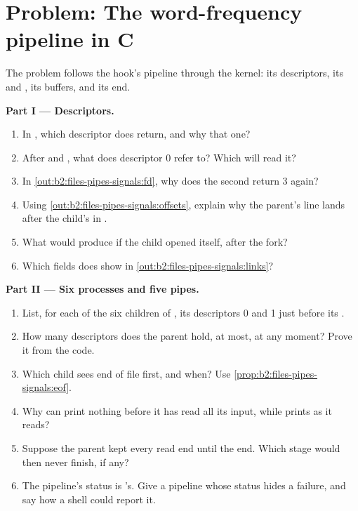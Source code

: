 \section{Problem: The word-frequency pipeline in C}\label{sec:b2:files-pipes-signals:problem}

\begin{problem}\label{pb:b2:files-pipes-signals:1}
The problem follows the hook's pipeline through the kernel: its descriptors, its  and , its
buffers, and its end.

\medskip\noindent\textbf{Part I --- Descriptors.}\par\nopagebreak
\begin{enumerate}
\item In , which descriptor does  return, and why that one?
\item After  and , what does descriptor 0 refer to? Which  will read it?
\item In \cref{out:b2:files-pipes-signals:fd}, why does the second  return 3 again?
\item Using \cref{out:b2:files-pipes-signals:offsets}, explain why the parent's line lands after the child's in
.
\item What would  produce if the child opened  itself, after the fork?
\item Which  fields does  show in \cref{out:b2:files-pipes-signals:links}?
\end{enumerate}

\medskip\noindent\textbf{Part II --- Six processes and five pipes.}\par\nopagebreak
\begin{enumerate}[resume, beginpenalty=10000]
\item List, for each of the six children of , its descriptors 0 and 1 just before its .
\item How many  descriptors does the parent hold, at most, at any moment? Prove it from the code.
\item Which child sees end of file first, and when? Use \cref{prop:b2:files-pipes-signals:eof}.
\item Why can  print nothing before it has read all its input, while  prints as it reads?
\item Suppose the parent kept every read end until the end. Which stage would then never finish, if any?
\item The pipeline's status is 's. Give a pipeline whose status hides a failure, and say how a shell could
report it.
\end{enumerate}


\end{problem}
